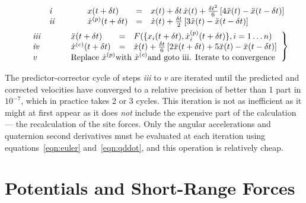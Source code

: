 \newlength{\myboxw}
\addtolength{\myboxw}{\textwidth}
\addtolength{\myboxw}{-15pt}
\begin{minipage}{\myboxw}
\begin{eqnarray}
& &
\begin{array}{llll}
\makebox[0.5in][l]{\em i} & x(t+\delta t) &=& x(t) + \delta t \, \dot{x}(t) + 
\frac{\delta t^2}{6} 
\left [ 4 \ddot{x}(t) - \ddot{x}(t-\delta t) \right ] \\
\makebox[0.5in][l]{\em ii}  & \dot{x}^{(p)}(t+\delta t) & = & \dot{x}(t) + 
\frac{\delta t}{2} \left [ 3 \ddot{x}(t)- \ddot{x}(t-\delta t) \right ]
\end{array} \nonumber \\
& &
\left .
\begin{array}{llll}
\makebox[0.5in][l]{\em iii}  & \ddot{x}(t+\delta t) & = & F(\{ x_i(t+\delta t),
\dot{x}_i^{(p)}(t+\delta t)\}, i =  1\ldots n) \\
\makebox[0.5in][l]{\em iv} & \dot{x}^{(c)}(t+\delta t) & = & \dot{x}(t) + \frac{\delta t}{6} 
\left [ 2 \ddot{x}(t+\delta t) + 5 \ddot{x}(t)- \ddot{x}(t-\delta t) \right ]\\
\makebox[0.5in][l]{\em v} & 
\lefteqn{\mbox{Replace } \dot{x}^{(p)} \mbox{with }
\dot{x}^{(c)} \mbox{and goto iii.  Iterate to convergence}}
\end{array} 
\right \}
\end{eqnarray}
\end{minipage}
\vspace{10pt}

The predictor-corrector cycle of steps {\em iii\/} to {\em v\/} are
iterated until the predicted and corrected velocities have converged
to a relative precision of better than 1 part in $10^{-7}$, which in
practice takes 2 or 3 cycles.  This iteration is not as inefficient as
it might at first appear as it does {\em not\/} include the expensive
part of the calculation --- the recalculation of the site forces.
Only the angular accelerations and quaternion second derivatives must
be evaluated at each iteration using equations~\ref{eqn:euler} 
and~\ref{eqn:qddot}, and this operation is relatively cheap.

\section{Potentials and Short-Range Forces}%

